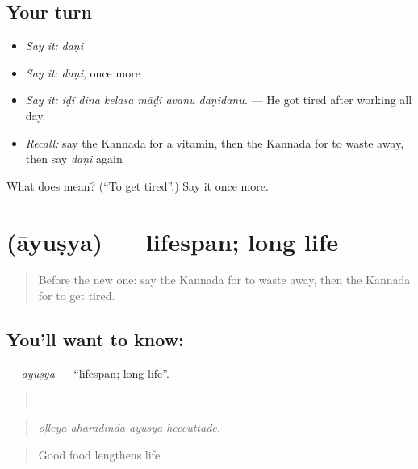 \subsection*{Your turn}
\begin{itemize}
\raggedright
  \item \emph{Say it:} \emph{daṇi}
  \item \emph{Say it:} \emph{daṇi}, once more
  \item \emph{Say it:} \emph{iḍī dina kelasa māḍi avanu daṇidanu.} — He got tired after working all day.
  \item \emph{Recall:} say the Kannada for a vitamin, then the Kannada for to waste away, then say \emph{daṇi} again
\end{itemize}

\begin{tcolorbox}[breakable,colback=teal!4,colframe=teal!35!black,title={Before you move on}]
What does  mean? (\textquotedblleft{}To get tired\textquotedblright{}.) Say it once more.
\end{tcolorbox}
\section[\texorpdfstring{\kn{ಆಯುಷ್ಯ} (āyuṣya)}{ಆಯುಷ್ಯ (āyuṣya)}]{ (āyuṣya) — lifespan; long life}

\label{lesson:KA-C514-ayusya}



\begin{quote}
Before the new one: say the Kannada for to waste away, then the Kannada for to get tired.
\end{quote}

\subsection*{You'll want to know: }
\textbf{} — \emph{āyuṣya} — \textquotedblleft{}lifespan; long life\textquotedblright{}.

\begin{quote}
   .
\end{quote}

\begin{quote}
\emph{oḷḷeya āhāradinda āyuṣya heccuttade.}
\end{quote}

\begin{quote}
Good food lengthens life.
\end{quote}

